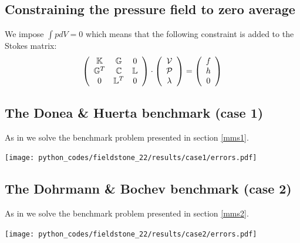 


\subsection*{Constraining the pressure field to zero average}

We impose $\int p dV=0$ which means that the following constraint is added 
to the Stokes matrix:
\[
\left(
\begin{array}{ccc}
{\mathbb{K}} & {\mathbb{G}} & 0\\ 
{\mathbb{G}}^T & {\mathbb{C}} & {\mathbb{L}} \\
0 & {\mathbb{L}}^T & 0 
\end{array}
\right)
\cdot
\left(
\begin{array}{c}
{\cal V} \\ {\cal P} \\ \lambda
\end{array}
\right)
=
\left(
\begin{array}{c}
 f \\ h \\ 0
\end{array}
\right)
\]




\subsection*{The Donea \& Huerta benchmark (case 1)}

As in \cite{dohu03} we solve the benchmark problem presented in section \ref{mms1}.

\begin{center}
\texttt{[image: python\_codes/fieldstone\_22/results/case1/errors.pdf]}
\end{center}

\subsection*{The Dohrmann \& Bochev benchmark (case 2)} 

As in \cite{dobo04} we solve the benchmark problem presented in section \ref{mms2}.

\begin{center}
\texttt{[image: python\_codes/fieldstone\_22/results/case2/errors.pdf]}
\end{center}

